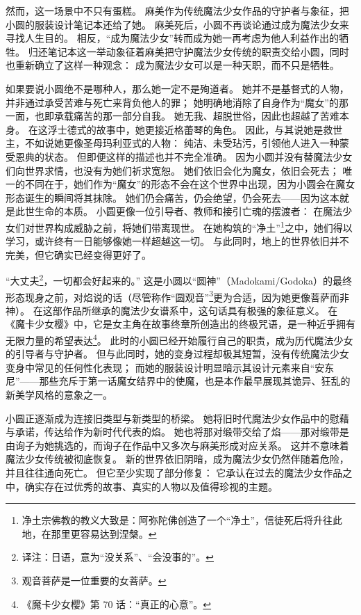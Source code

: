 然而，这一场景中不只有蛋糕。
麻美作为传统魔法少女作品的守护者与象征，把小圆的服装设计笔记本还给了她。
麻美死后，小圆不再谈论通过成为魔法少女来寻找人生目的。
相反，“成为魔法少女”转而成为她一再考虑为他人利益作出的牺牲。
归还笔记本这一举动象征着麻美把守护魔法少女传统的职责交给小圆，同时也重新确立了这样一种观念：
成为魔法少女可以是一种天职，而不只是牺牲。

如果要说小圆绝不是哪种人，那么她一定不是殉道者。
她并不是基督式的人物，并非通过承受苦难与死亡来背负他人的罪；
她明确地消除了自身作为“魔女”的那一面，也即承载痛苦的那一部分自我。
她无我、超脱世俗，因此也超越了苦难本身。
在这浮士德式的故事中，她更接近格蕾琴\cite{ref72}的角色。
因此，与其说她是救世主，不如说她更像圣母玛利亚式的人物：
纯洁、未受玷污，引领他人进入一种蒙受恩典的状态。
但即便这样的描述也并不完全准确。
因为小圆并没有替魔法少女们向世界求情，也没有为她们祈求宽恕。
她们依旧会化为魔女，依旧会死去；
唯一的不同在于，她们作为“魔女”的形态不会在这个世界中出现，因为小圆会在魔女形态诞生的瞬间将其抹除。
她们仍会痛苦，仍会绝望，仍会死去——因为这本就是此世生命的本质。
小圆更像一位引导者、教师和接引亡魂的摆渡者：
在魔法少女们对世界构成威胁之前，将她们带离现世。
在她构筑的“净土”\footnote{%
    净土宗佛教的教义大致是：阿弥陀佛创造了一个“净土”，信徒死后将升往此地，在那里更容易达到涅槃。
}\cite{ref73}之中，她们得以学习，或许终有一日能够像她一样超越这一切。
与此同时，地上的世界依旧并不完美，但它确实已经变得更好了。

“大丈夫\footnote{%
    译注：日语，意为“没关系”、“会没事的”。
}，一切都会好起来的。”
这是小圆以“圆神”（Madokami/Godoka）的最终形态现身之前，对焰说的话（尽管称作“圆观音”\footnote{%
    观音菩萨是一位重要的女菩萨。
}\cite{ref73}更为合适，因为她更像菩萨而非神）。
在这部作品所继承的魔法少女谱系中，这句话具有极强的象征意义。
在《魔卡少女樱》中，它是女主角在故事终章所创造出的终极咒语，是一种近乎拥有无限力量的希望表达\footnote{%
    《魔卡少女樱》第 70 话：“真正的心意”。
}。
此时的小圆已经开始履行自己的职责，成为历代魔法少女的引导者与守护者。
但与此同时，她的变身过程却极其短暂，没有传统魔法少女变身中常见的任何性化表现；
而她的服装设计明显暗示其设计元素来自“安东尼”——那些充斥于第一话魔女结界中的使魔，也是本作最早展现其诡异、狂乱的新美学风格的意象之一。

小圆正逐渐成为连接旧类型与新类型的桥梁。
她将旧时代魔法少女作品中的慰藉与承诺，传达给作为新时代代表的焰。
她也将那对缎带交给了焰——那对缎带是由询子为她挑选的，而询子在作品中又多次与麻美形成对应关系。
这并不意味着魔法少女传统被彻底恢复。
新的世界依旧阴暗，成为魔法少女仍然伴随着危险，并且往往通向死亡。
但它至少实现了部分修复：
它承认在过去的魔法少女作品之中，确实存在过优秀的故事、真实的人物以及值得珍视的主题。

